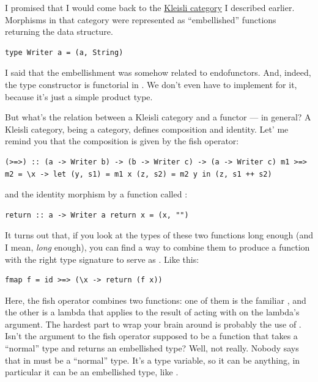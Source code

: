 I promised that I would come back to the
\href{https://bartoszmilewski.com/2014/12/23/kleisli-categories/}{Kleisli
category} I described earlier. Morphisms in that category were
represented as ``embellished'' functions returning the 
data structure.

\begin{verbatim}
type Writer a = (a, String)
\end{verbatim}

I said that the embellishment was somehow related to endofunctors. And,
indeed, the  type constructor is functorial in
. We don't even have to implement  for it,
because it's just a simple product type.

But what's the relation between a Kleisli category and a functor --- in
general? A Kleisli category, being a category, defines composition and
identity. Let' me remind you that the composition is given by the fish
operator:

\begin{verbatim}
(>=>) :: (a -> Writer b) -> (b -> Writer c) -> (a -> Writer c) m1 >=> m2 = \x -> let (y, s1) = m1 x (z, s2) = m2 y in (z, s1 ++ s2)
\end{verbatim}

and the identity morphism by a function called :

\begin{verbatim}
return :: a -> Writer a return x = (x, "")
\end{verbatim}

It turns out that, if you look at the types of these two functions long
enough (and I mean, \emph{long} enough), you can find a way to combine
them to produce a function with the right type signature to serve as
. Like this:

\begin{verbatim}
fmap f = id >=> (\x -> return (f x))
\end{verbatim}

Here, the fish operator combines two functions: one of them is the
familiar , and the other is a lambda that applies
 to the result of acting with  on the lambda's
argument. The hardest part to wrap your brain around is probably the use
of . Isn't the argument to the fish operator supposed to be a
function that takes a ``normal'' type and returns an embellished type?
Well, not really. Nobody says that  in
 must be a ``normal'' type. It's a
type variable, so it can be anything, in particular it can be an
embellished type, like .

